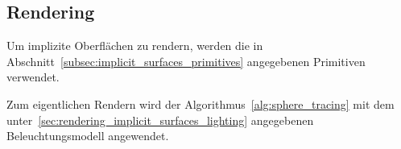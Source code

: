 
\subsection{Rendering}
\label{sec:rendering_implicit_surfaces_Rendering}

Um implizite Oberflächen zu rendern, werden die in
Abschnitt~\ref{subsec:implicit_surfaces_primitives} angegebenen
Primitiven verwendet.

Zum eigentlichen Rendern wird der Algorithmus~\ref{alg:sphere_tracing}
mit dem unter~\autoref{sec:rendering_implicit_surfaces_lighting}
angegebenen Beleuchtungsmodell angewendet.
